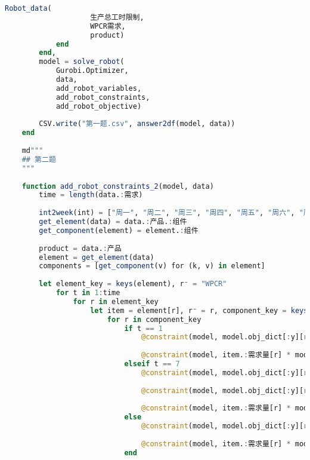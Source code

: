 \begin{appendices}
\begin{lstlisting}[language=julia]
                Robot_data(
                    生产总工时限制,
                    WPCR需求,
                    product)
            end
        end,
        model = solve_robot(
            Gurobi.Optimizer,
            data,
            add_robot_variables,
            add_robot_constraints,
            add_robot_objective)
    
        CSV.write("第一题.csv", answer2df(model, data))
    end
    
    md"""
    ## 第二题
    """
    
    function add_robot_constraints_2(model, data)
        time = length(data.:需求)
    
        int2week(int) = ["周一", "周二", "周三", "周四", "周五", "周六", "周日"][int]
        get_element(data) = data.:产品.:组件
        get_component(element) = element.:组件
    
        product = data.:产品
        element = get_element(data)
        components = [get_component(v) for (k, v) in element]
    
        let element_key = keys(element), r⁻ = "WPCR"
            for t in 1:time
                for r in element_key
                    let item = element[r], r⁻ = r, component_key = keys(item.:组件)
                        for r in component_key
                            if t == 1
                                @constraint(model, model.obj_dict[:y][r, t] == 0 + model.obj_dict[:x][r, t] - item.:需求量[r] * model.obj_dict[:x][r⁻, t])
    
                                @constraint(model, item.:需求量[r] * model.obj_dict[:x][r⁻, t] <= 0)
                            elseif t == 7
                                @constraint(model, model.obj_dict[:y][r, t] == model.obj_dict[:y][r, t-1] + model.obj_dict[:x][r, t] - item.:需求量[r] * model.obj_dict[:x][r⁻, t])
    
                                @constraint(model, model.obj_dict[:y][r, t] == 0)
    
                                @constraint(model, item.:需求量[r] * model.obj_dict[:x][r⁻, t] <= model.obj_dict[:y][r, t-1])
                            else
                                @constraint(model, model.obj_dict[:y][r, t] == model.obj_dict[:y][r, t-1] + model.obj_dict[:x][r, t] - item.:需求量[r] * model.obj_dict[:x][r⁻, t])
    
                                @constraint(model, item.:需求量[r] * model.obj_dict[:x][r⁻, t] <= model.obj_dict[:y][r, t-1])
                            end
    

\end{lstlisting}
\end{appendices}
